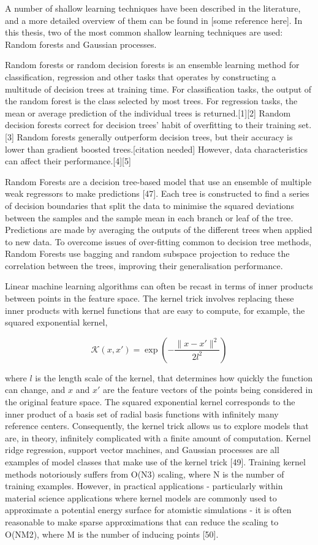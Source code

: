 A number of shallow learning techniques have been described in the literature, and a more detailed overview of them can be found in [some reference here]. In this thesis, two of the most common shallow learning techniques are used: Random forests and Gaussian processes.

Random forests or random decision forests is an ensemble learning method for classification, regression and other tasks that operates by constructing a multitude of decision trees at training time. For classification tasks, the output of the random forest is the class selected by most trees. For regression tasks, the mean or average prediction of the individual trees is returned.[1][2] Random decision forests correct for decision trees' habit of overfitting to their training set.[3] Random forests generally outperform decision trees, but their accuracy is lower than gradient boosted trees.[citation needed] However, data characteristics can affect their performance.[4][5]

Random Forests are a decision tree-based model that use an ensemble of multiple weak regressors to make predictions [47]. Each tree is constructed to find a series of decision boundaries that split the data to minimise the squared deviations between the samples and the sample mean in each branch or leaf of the tree. Predictions are made by averaging the outputs of the different trees when applied to new data. To overcome issues of over-fitting common to decision tree methods, Random Forests use bagging and random subspace projection to reduce the correlation between the trees, improving their generalisation performance.

Linear machine learning algorithms can often be recast in terms of inner products between points in the feature space. The kernel trick involves replacing these inner products with kernel functions that are easy to compute, for example, the squared exponential kernel,

\begin{equation}
    \mathcal{K}(x , x') = \exp\left(-\frac{\|x - x'\|^{2}}{2l^{2}}\right)
\end{equation}

where $l$ is the length scale of the kernel, that determines how quickly the function can change, and $x$ and $x'$ are the feature vectors of the points being considered in the original feature space. The squared exponential kernel corresponds to the inner product of a basis set of radial basis functions with infinitely many reference centers. Consequently, the kernel trick allows us to explore models that are, in theory, infinitely complicated with a finite amount of computation. Kernel ridge regression, support vector machines, and Gaussian processes are all examples of model classes that make use of the kernel trick [49]. Training kernel methods notoriously suffers from O(N3) scaling, where N is the number of training examples. However, in practical applications - particularly within material science applications where kernel models are commonly used to approximate a potential energy surface for atomistic simulations - it is often reasonable to make sparse approximations that can reduce the scaling to O(NM2), where M is the number of inducing points [50].


